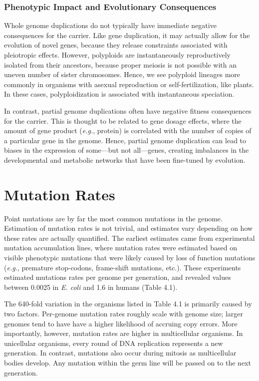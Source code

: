 \documentclass[
]{book}
\begin{document}
\hypertarget{phenotypic-impact-and-evolutionary-consequences-3}{%
\subsubsection*{Phenotypic Impact and Evolutionary Consequences}\label{phenotypic-impact-and-evolutionary-consequences-3}}

Whole genome duplications do not typically have immediate negative consequences for the carrier. Like gene duplication, it may actually allow for the evolution of novel genes, because they release constraints associated with pleiotropic effects. However, polyploids are instantaneously reproductively isolated from their ancestors, because proper meiosis is not possible with an uneven number of sister chromosomes. Hence, we see polyploid lineages more commonly in organisms with asexual reproduction or self-fertilization, like plants. In these cases, polyploidization is associated with instantaneous speciation.

In contrast, partial genome duplications often have negative fitness consequences for the carrier. This is thought to be related to gene dosage effects, where the amount of gene product (\emph{e.g.}, protein) is correlated with the number of copies of a particular gene in the genome. Hence, partial genome duplication can lead to biases in the expression of some---but not all---genes, creating imbalances in the developmental and metabolic networks that have been fine-tuned by evolution.

\hypertarget{mutation-rates}{%
\section{Mutation Rates}\label{mutation-rates}}

Point mutations are by far the most common mutations in the genome. Estimation of mutation rates is not trivial, and estimates vary depending on how these rates are actually quantified. The earliest estimates came from experimental mutation accumulation lines, where mutation rates were estimated based on visible phenotypic mutations that were likely caused by loss of function mutations (\emph{e.g.}, premature stop-codons, frame-shift mutations, etc.). These experiments estimated mutations rates per genome per generation, and revealed values between 0.0025 in \emph{E. coli} and 1.6 in humans (Table 4.1).

The 640-fold variation in the organisms listed in Table 4.1 is primarily caused by two factors. Per-genome mutation rates roughly scale with genome size; larger genomes tend to have have a higher likelihood of accruing copy errors. More importantly, however, mutation rates are higher in multicellular organisms. In unicellular organisms, every round of DNA replication represents a new generation. In contrast, mutations also occur during mitosis as multicellular bodies develop. Any mutation within the germ line will be passed on to the next generation.
\end{document}
